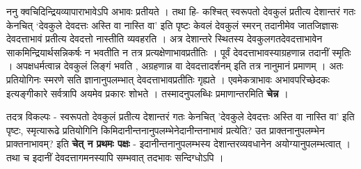 ननु क्वचिदिन्द्रियव्यापाराभावेऽपि अभावः प्रतीयते । तथा हि- कश्चित् स्वरूपतो देवकुलं प्रतीत्य देशान्तरं गतः केनचित् ‘देवकुले देवदत्तः अस्ति वा नास्ति वा’ इति पृष्टः केवलं देवकुलं स्मरन् तदानीमेव जातजिज्ञासः देवदत्ताभावं प्रतीत्य देवदत्तो नास्तीति व्यवहरति । अत्र देशान्तरे स्थितस्य देवकुलगतदेवदत्ताभावेन साकमिन्द्रियार्थसन्निकर्षः न भवतीति न तत्र प्रत्यक्षेणाभावप्रतीतिः । पूर्वं देवदत्ताभावस्याग्रहणान्न तदानीं स्मृतिः । अपक्षधर्मत्वान्न देवकुलं लिङ्गं भवति , अग्रहणान्न वा देवदत्तादर्शनम् इति तत्र नानुमानं प्रमाणम् । अतः प्रतियोगिनः स्मरणे सति ज्ञानानुपलम्भात् देवदत्ताभावप्रतीतिः गृह्यते । एवमेकत्राभावः अभावपरिच्छेदकः इत्यङ्गीकारे सर्वत्रापि अयमेव प्रकारः शोभते । तस्मादनुपलब्धिः प्रमाणान्तरमिति \textbf{चेन्न} ।

तदत्र विकल्पः - स्वरूपतो देवकुलं प्रतीत्य देशान्तरं गतः केनचित् 'देवकुले देवदत्तः अस्ति वा नास्ति वा' इति पृष्टः, स्मृत्यारूढे प्रतियोगिनि किमिदानीन्तनानुपलम्भेनेदानीन्तनाभावं प्रत्येति? उत प्राक्तनानुपलम्भेन प्राक्तनाभावम्? इति \textbf{चेत् न प्रथमः पक्षः} - इदानीन्तनानुपलम्भस्य देशान्तरव्यवधानेन अयोग्यानुपलम्भत्वात् । तथा च इदानीं देवदत्तागमनस्यापि सम्भवात् तदभावः सन्दिग्धोऽपि ।

